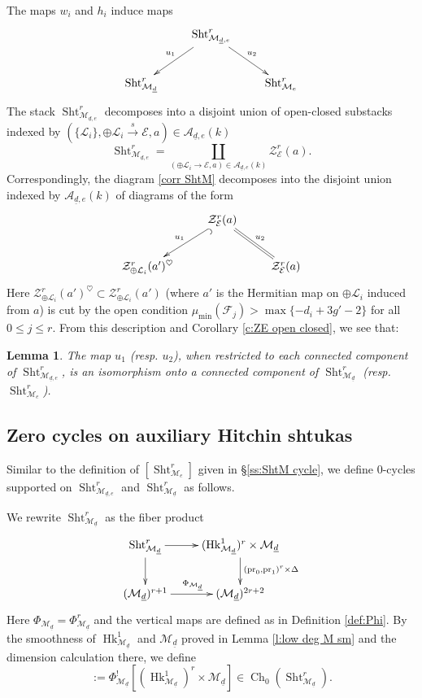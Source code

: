 \documentclass[reqno]{amsart}
\numberwithin{equation}{section}
\DeclareMathOperator{\Sht}{Sht}
\DeclareMathOperator{\pr}{pr}
\DeclareMathOperator{\Hk}{Hk}
\DeclareMathOperator{\Ch}{Ch}
\newcommand\un{\underline}
\newcommand\xr{\xrightarrow}
\newcommand\op{\oplus}
\newcommand\hs{\heartsuit}
\newcommand\cA{\mathcal{A}}
\newcommand\cE{\mathcal{E}}
\newcommand\cF{\mathcal{F}}
\newcommand\cL{\mathcal{L}}
\newcommand\cM{\mathcal{M}}
\newcommand\cZ{\mathcal{Z}}
\newtheorem{lemma}[thm]{Lemma}
\theoremstyle{remark}
\numberwithin{equation}{section}
\begin{document}
The maps $w_{i}$ and $h_{i}$ induce maps
\begin{equation}\label{corr ShtM}
\xymatrix{& \Sht^{r}_{\cM_{\un d,e}}\ar[dl]_{u_{1}}\ar[dr]^{u_{2}}\\
\Sht^{r}_{\cM_{\un d}} & & \Sht^{r}_{\cM_{e}}}
\end{equation}
The stack $\Sht^{r}_{\cM_{\un d,e}}$ decomposes into a disjoint union of open-closed substacks indexed by $(\{\cL_{i}\}, \op\cL_{i}\xr{s} \cE, a)\in \cA_{\un d,e}(k)$ 
\begin{equation}
\Sht^{r}_{\cM_{\un d,e}}=\coprod_{(\op\cL_{i}\to \cE, a)\in \cA_{\un d,e}(k)}\cZ^{r}_{\cE}(a).
\end{equation}
Correspondingly, the diagram \eqref{corr ShtM} decomposes into the disjoint union indexed by $\cA_{\un d,e}(k)$ of diagrams of the form
\begin{equation}
\xymatrix{ & \cZ^{r}_{\cE}(a)\ar@{^{(}->}[dl]_{u_{1}}\ar@{=}[dr]^{u_{2}}\\
\cZ^{r}_{\op\cL_{i}}(a')^{\hs} & & \cZ^{r}_{\cE}(a) }
\end{equation}
Here $\cZ^{r}_{\op\cL_{i}}(a')^{\hs}\subset \cZ^{r}_{\op\cL_{i}}(a')$ (where $a'$ is the Hermitian map on $\op\cL_{i}$ induced from $a$) is cut by the open condition $\mu_{\min}(\cF_{j})>\max\{-d_{i}+3g'-2\}$ for all $0\le j\le r$. From this description  and Corollary \ref{c:ZE open closed}, we see that:

\begin{lemma}\label{l:ShtM isom}
The map $u_{1}$ (resp. $u_{2}$), when restricted to each connected component of $\Sht^{r}_{\cM_{\un d,e}}$, is an isomorphism onto a connected component of $\Sht^{r}_{\cM_{\un d}}$ (resp. $\Sht^{r}_{\cM_{e}}$).
\end{lemma}


\subsection{Zero cycles on auxiliary Hitchin shtukas}
Similar to the definition of $[\Sht^{r}_{\cM_{e}}]$ given in \S\ref{ss:ShtM cycle}, we define $0$-cycles supported on $\Sht^{r}_{\cM_{\un d,e}}$ and $\Sht^{r}_{\cM_{\un d}}$ as follows.

We rewrite $\Sht^{r}_{\cM_{\un d}}$ as the fiber product
\begin{equation}\label{rewrite ShtM und}
\xymatrix{\Sht^{r}_{\cM_{\un d}}\ar[d]\ar[r] & (\Hk^{1}_{\cM_{\un d}})^{r}\ar[d]^{(\pr_{0},\pr_{1})^{r} \times \Delta} \times \cM_{\un d}\\
(\cM_{\un d})^{r+1}\ar[r]^{\Phi_{\cM_{\un d}}} & (\cM_{\un d})^{2r+2}
}
\end{equation}
Here $\Phi_{\cM_{\un d}}=\Phi^{r}_{\cM_{\un d}}$ and the vertical maps are defined as in Definition \ref{def:Phi}. By the smoothness of $\Hk^{1}_{\cM_{\un d}}$ and $\cM_{\un d}$ proved in Lemma \ref{l:low deg M sm} and the dimension calculation there, we define
\begin{equation}
[\Sht^{r}_{\cM_{\un d}}]:=\Phi_{\cM_{\un d}}^{!}[(\Hk^{1}_{\cM_{\un d}})^{r} \times \cM_{\un d}]\in\Ch_{0}(\Sht^{r}_{\cM_{\un d}}).
\end{equation}
\end{document}
